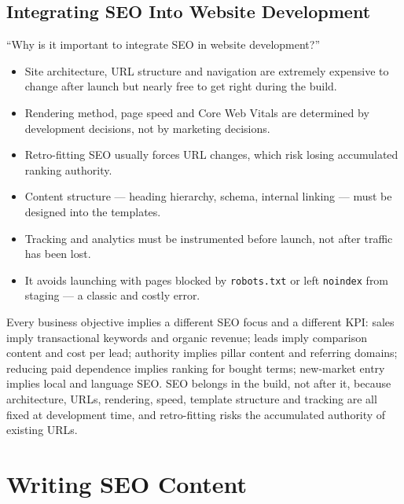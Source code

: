 \section{Integrating SEO Into Website Development}

\begin{exambox}
``Why is it important to integrate SEO in website development?''

\begin{itemize}
\item Site architecture, URL structure and navigation are extremely expensive to
      change after launch but nearly free to get right during the build.
\item Rendering method, page speed and Core Web Vitals are determined by
      development decisions, not by marketing decisions.
\item Retro-fitting SEO usually forces URL changes, which risk losing
      accumulated ranking authority.
\item Content structure --- heading hierarchy, schema, internal linking --- must
      be designed into the templates.
\item Tracking and analytics must be instrumented before launch, not after
      traffic has been lost.
\item It avoids launching with pages blocked by \texttt{robots.txt} or left
      \texttt{noindex} from staging --- a classic and costly error.
\end{itemize}
\end{exambox}

\begin{summarybox}
Every business objective implies a different SEO focus and a different KPI:
sales imply transactional keywords and organic revenue; leads imply comparison
content and cost per lead; authority implies pillar content and referring
domains; reducing paid dependence implies ranking for bought terms; new-market
entry implies local and language SEO. SEO belongs in the build, not after it,
because architecture, URLs, rendering, speed, template structure and tracking are
all fixed at development time, and retro-fitting risks the accumulated authority
of existing URLs.
\end{summarybox}

\chapter{Writing SEO Content}

